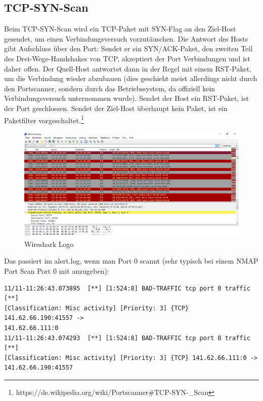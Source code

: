 \documentclass[a4paper]{report}
\begin{document}

\subsection{TCP-SYN-Scan}
Beim TCP-SYN-Scan wird ein TCP-Paket mit SYN-Flag an den Ziel-Host gesendet, um einen Verbindungsversuch vorzutäuschen. Die Antwort des Hosts gibt Aufschluss über den Port: Sendet er ein SYN/ACK-Paket, den zweiten Teil des Drei-Wege-Handshakes von TCP, akzeptiert der Port Verbindungen und ist daher offen. Der Quell-Host antwortet dann in der Regel mit einem RST-Paket, um die Verbindung wieder abzubauen (dies geschieht meist allerdings nicht durch den Portscanner, sondern durch das Betriebssystem, da offiziell kein Verbindungsversuch unternommen wurde). Sendet der Host ein RST-Paket, ist der Port geschlossen. Sendet der Ziel-Host überhaupt kein Paket, ist ein Paketfilter vorgeschaltet.\footnote{https://de.wikipedia.org/wiki/Portscanner\#TCP-SYN-\_Scan}

\begin{figure}[htb]
	\centering
	\includegraphics[width=1.0\textwidth]{pics/latex/tcpsynscan.png}
	\caption{Wireshark Logo}
	\label{fig:wiresharklogo}
\end{figure}

Das passiert im alert.log, wenn man Port 0 scannt (sehr typisch bei einem NMAP Port Scan Port 0 mit anzugeben):
\begin{lstlisting}
11/11-11:26:43.073895  [**] [1:524:8] BAD-TRAFFIC tcp port 0 traffic [**]
[Classification: Misc activity] [Priority: 3] {TCP} 141.62.66.190:41557 ->
141.62.66.111:0
11/11-11:26:43.074293  [**] [1:524:8] BAD-TRAFFIC tcp port 0 traffic [**]
[Classification: Misc activity] [Priority: 3] {TCP} 141.62.66.111:0 ->
141.62.66.190:41557
\end{lstlisting}
\end{document}

